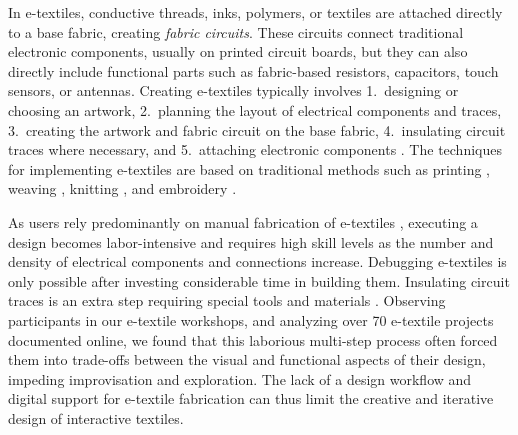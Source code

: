 \documentclass[header.tex]{subfiles}
\begin{document}
In e-textiles, conductive threads, inks, polymers, or textiles are attached directly to a base fabric, creating \textit{fabric circuits}. These circuits connect traditional electronic components, usually on printed circuit boards, but they can also directly include functional parts such as fabric-based resistors, capacitors, touch sensors, or antennas. %
Creating e-textiles typically involves 1.\ designing or choosing an artwork, 2.\ planning the layout of electrical components and traces, 3.\ creating the artwork and fabric circuit on the base fabric, 4.\ insulating circuit traces where necessary, and 5.\ attaching electronic components \cite{Lovell:2010:ETD:1810543.1810578}. 
The techniques for implementing e-textiles are based on traditional methods such as printing \cite{kim2010electrical}, weaving \cite{kallmayer2003new}, knitting \cite{farringdon1999wearable}, and  embroidery \cite{5387040}.



As users rely predominantly on manual fabrication of e-textiles \cite{Kazemitabaar:2017:MTA:3025453.3025887}, executing a design becomes labor-intensive and requires high skill levels as the number and density of electrical components and connections increase. Debugging e-textiles is only possible after investing considerable time in building them. Insulating circuit traces is an extra step requiring special tools and materials \cite{Buechley2009}. Observing participants in our e-textile workshops, and analyzing over 70 e-textile projects documented online, we found that this laborious multi-step process often forced them into trade-offs between the visual and functional aspects of their design, impeding improvisation and exploration. The lack of a design workflow and digital support for e-textile fabrication can thus limit the creative and iterative design of interactive textiles.

\end{document}
